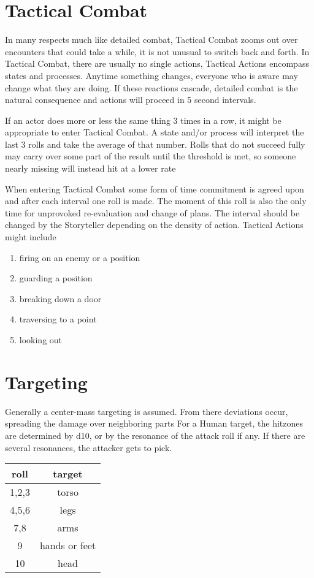 \section{Tactical Combat}\label{sec:tactical-combat}
In many respects much like detailed combat, Tactical Combat zooms out over encounters that could take a while,
it is not unusual to switch back and forth.
In Tactical Combat, there are usually no single actions, Tactical Actions encompass states and processes.
Anytime something changes, everyone who is aware may change what they are doing.
If these reactions cascade, detailed combat is the natural consequence and actions will proceed in 5 second intervals.


If an actor does more or less the same thing 3 times in a row, it might be appropriate to enter Tactical Combat.
A state and/or process will interpret the last 3 rolls and take the average of that number.
Rolls that do not succeed fully may carry over some part of the result until the threshold is met, so someone nearly
missing will instead hit at a lower rate


When entering Tactical Combat some form of time commitment is agreed upon and after each interval one roll is made.
The moment of this roll is also the only time for unprovoked re-evaluation and change of plans.
The interval should be changed by the Storyteller depending on the density of action.
Tactical Actions might include \par
\begin{enumerate}
    \item firing on an enemy or a position
    \item guarding a position
    \item breaking down a door
    \item traversing to a point
    \item looking out
\end{enumerate}

\section{Targeting}\label{sec:combat-targeting}
Generally a center-mass targeting is assumed.
From there deviations occur, spreading the damage over neighboring parts
For a Human target, the hitzones are determined by d10, or by the resonance of the attack roll if any.
If there are several resonances, the attacker gets to pick.


\begin{tabular}{cc}
    roll & target\\\hline
    1,2,3 & torso \\
    4,5,6 & legs \\
    7,8 & arms \\
    9 & hands or feet \\
    10 & head
\end{tabular}

